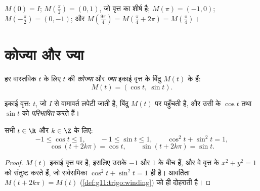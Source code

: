 \begin{example}
$M(0) = I$; $M\!\left(\frac{\pi}{2}\right) = (0, 1)$, जो वृत्त का शीर्ष है; $M(\pi) = (-1, 0)$; $M\!\left(-\frac{\pi}{2}\right) = (0, -1)$; और $M\!\left(\frac{9\pi}{4}\right) = M\!\left(\frac{\pi}{4} +
2\pi\right) = M\!\left(\frac{\pi}{4}\right)$।
\end{example}

\section{कोज्या और ज्या}

\begin{definition}[कोज्या और ज्या]\label{def:g11:trigo:cossin}
हर वास्तविक $t$ के लिए $t$ की \emph{कोज्या} और
\emph{ज्या} इकाई वृत्त के बिंदु $M(t)$ के  हैं:
\[
M(t) = (\cos t,\ \sin t).
\]
\end{definition}

\begin{omfigure}

{\small इकाई वृत्त:  $t$, जो $I$ से वामावर्त लपेटी जाती है,
बिंदु $M(t)$ पर पहुँचती है, और उसी के  $\cos t$ तथा $\sin t$ को
\emph{परिभाषित} करते हैं।}
\end{omfigure}

\begin{proposition}[पहले गुण]\label{prop:g11:trigo:first}
सभी $t \in \R$ और $k \in \Z$ के लिए:
\[
-1 \leq \cos t \leq 1, \qquad
-1 \leq \sin t \leq 1, \qquad
\cos^2 t + \sin^2 t = 1,
\]
\[
\cos(t + 2k\pi) = \cos t, \qquad \sin(t + 2k\pi) = \sin t .
\]
\end{proposition}

\begin{proof}
$M(t)$ इकाई वृत्त पर है, इसलिए उसके  $-1$ और $1$ के बीच हैं, और वे
वृत्त के  $x^2 + y^2 = 1$ को संतुष्ट करते हैं, जो सर्वसमिका $\cos^2 t + \sin^2 t = 1$ ही है। आवर्तिता
$M(t + 2k\pi) = M(t)$ (\cref{def:g11:trigo:winding}) को ही दोहराती है।
\end{proof}

